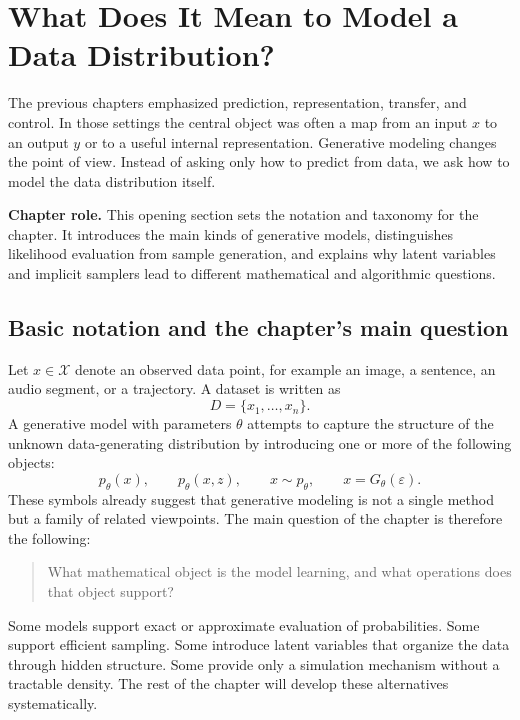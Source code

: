 \section{What Does It Mean to Model a Data Distribution?}

The previous chapters emphasized prediction, representation, transfer, and control.
In those settings the central object was often a map from an input $x$ to an output $y$ or to a useful internal representation.
Generative modeling changes the point of view.
Instead of asking only how to predict from data, we ask how to model the data distribution itself.

\medskip

\noindent
\textbf{Chapter role.}
This opening section sets the notation and taxonomy for the chapter.
It introduces the main kinds of generative models, distinguishes likelihood evaluation from sample generation, and explains why latent variables and implicit samplers lead to different mathematical and algorithmic questions.

\subsection*{Basic notation and the chapter's main question}

Let $x\in\mathcal{X}$ denote an observed data point, for example an image, a sentence, an audio segment, or a trajectory.
A dataset is written as
\[
D = \{x_1,\dots,x_n\}.
\]
A generative model with parameters $\theta$ attempts to capture the structure of the unknown data-generating distribution by introducing one or more of the following objects:
\[
p_\theta(x), \qquad p_\theta(x,z), \qquad x\sim p_\theta, \qquad x = G_\theta(\varepsilon).
\]
These symbols already suggest that generative modeling is not a single method but a family of related viewpoints.
The main question of the chapter is therefore the following:

\begin{quote}
What mathematical object is the model learning, and what operations does that object support?
\end{quote}

Some models support exact or approximate evaluation of probabilities.
Some support efficient sampling.
Some introduce latent variables that organize the data through hidden structure.
Some provide only a simulation mechanism without a tractable density.
The rest of the chapter will develop these alternatives systematically.

